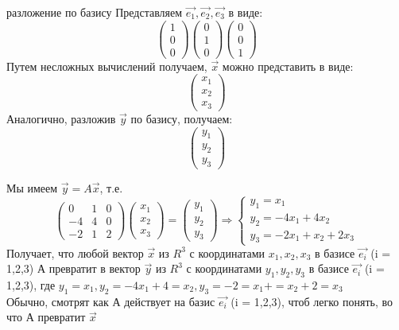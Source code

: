 \begin{frame}{разложение по базису}
Представляем $\vec{e_{1}}, \vec{e_{2}}, \vec{e_{3}}$ в виде:
\[
\left(\begin{array}{l}
    1 \\
    0 \\
    0
\end{array}\right)
\left(\begin{array}{l}
    0 \\
    1 \\
    0
\end{array}\right)
\left(\begin{array}{l}
    0 \\
    0 \\
    1
\end{array}\right)
\]
Путем несложных вычислений получаем, $\vec{x}$ можно представить в виде:
\[
\left(\begin{array}{l}
    x_{1} \\
    x_{2} \\
    x_{3}
\end{array}\right)
\]
Аналогично, разложив $\vec{y}$ по базису, получаем:
\[
\left(\begin{array}{l}
    y_{1} \\
    y_{2} \\
    y_{3}
\end{array}\right)
\]
\end{frame}


\begin{frame}{}
Мы имеем $\vec{y} = A\vec{x}$, т.е.
\[
\left(\begin{array}{lll}
    0 & 1 & 0 \\
    -4 & 4 & 0 \\
    -2 & 1 & 2
\end{array}\right)
\left(\begin{array}{l}
    x_{1} \\
    x_{2} \\
    x_{3}
\end{array}\right) =
\left(\begin{array}{l}
    y_{1} \\
    y_{2} \\
    y_{3}
\end{array}\right) \Rightarrow
    \left\{\begin{array}{l}
    y_{1} = x_{1}\\
    y_{2} = -4x_{1} + 4x_{2}\\
    y_{3} = -2x_{1} +x_{2} +2x_{3}
    \end{array}\right.
\]
Получает, что любой вектор $\vec{x}$ из $R^3$ с координатами $x_{1}, x_{2}, x_{3}$ в базисе $\vec{e_{i}}$ (i = 1,2,3) А превратит в вектор $\vec{y}$ из $R^3$ с координатами $y_{1}, y_{2}, y_{3}$ в базисе $\vec{e_{i}}$ (i = 1,2,3), где $y_{1} = x_{1}, y_{2} = -4x_{1} + 4= x_{2}, y_{3} = -2= x_{1} += x_{2} +2= x_{3}$ \\
Обычно, смотрят как А действует на базис $\vec{e_{i}}$ (i = 1,2,3), чтоб легко понять, во что А превратит $\vec{x}$
\end{frame}

